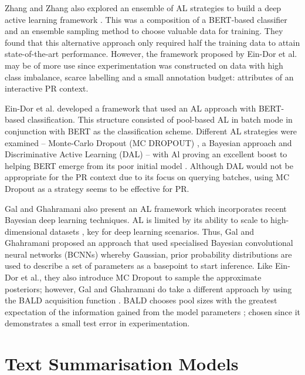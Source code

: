 \documentclass[ %
                    author={James Stephenson},
                supervisor={Dr. Edwin Simpson},
                    degree={MSc},
                     title={Project Plan: Bayesian Deep Learning For Extractive Test Summarisation},
                  subtitle={},
                      type={},
                      year={2022}]{../additions/dissertation}
\begin{document}
		\medbreak
		Zhang and Zhang also explored an ensemble of AL strategies to build a deep active learning framework \cite{Zhang19}. This was a composition of a BERT-based classifier and an ensemble sampling method to choose valuable data for training. They found that this alternative approach only required half the training data to attain state-of-the-art performance. However, the framework proposed by Ein-Dor et al. \cite{EinDor20} may be of more use since experimentation was constructed on data with high class imbalance, scarce labelling and a small annotation budget: attributes of an interactive PR context.  
		
		\medbreak
		Ein-Dor et al. \cite{EinDor20} developed a framework that used an AL approach with BERT-based classification. This structure consisted of pool-based AL in batch mode in conjunction with BERT as the classification scheme. Different AL strategies were examined – Monte-Carlo Dropout (MC DROPOUT) \cite{Gal15}, a Bayesian approach and Discriminative Active Learning (DAL) \cite{Gissin19} – with Al proving an excellent boost to helping BERT emerge from its poor initial model \cite{EinDor20}. Although DAL would not be appropriate for the PR context due to its focus on querying batches, using MC Dropout as a strategy seems to be effective for PR.
		
		\medbreak
		Gal and Ghahramani \cite{Gal17} also present an AL framework which incorporates recent Bayesian deep learning techniques. AL is limited by its ability to scale to high-dimensional datasets \cite{Tong01}, key for deep learning scenarios. Thus, Gal and Ghahramani proposed an approach that used specialised Bayesian convolutional neural networks (BCNNs) whereby Gaussian, prior probability distributions are used to describe a set of parameters as a basepoint to start inference. Like Ein-Dor et al., they also introduce MC Dropout to sample the approximate posteriors; however, Gal and Ghahramani do take a different approach by using the BALD acquisition function \cite{Houlsby11}. BALD chooses pool sizes with the greatest expectation of the information gained from the model parameters \cite{Gal17}; chosen since it demonstrates a small test error in experimentation.

		\section{Text Summarisation Models}
		\label{chap:literaturereview:summodels}
		
\end{document}
